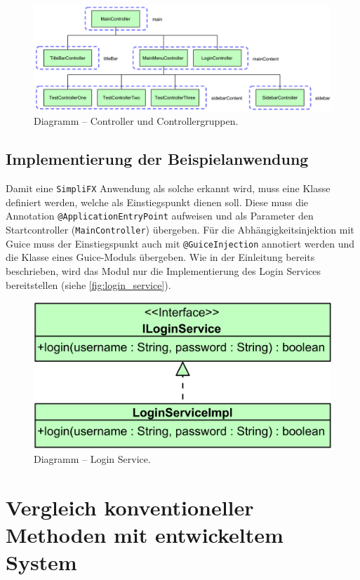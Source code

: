 \begin{figure}[H]
	\centering
	\includegraphics[width=\textwidth]{Abbildungen/Controller Relations.png}
	\caption{Diagramm -- Controller und Controllergruppen.}
	\label{fig:controller_relations}
\end{figure}
\subsection{Implementierung der Beispielanwendung}
Damit eine \texttt{SimpliFX} Anwendung als solche erkannt wird, muss eine Klasse definiert werden, welche als Einstiegspunkt dienen soll. Diese muss die Annotation \texttt{@ApplicationEntryPoint} aufweisen und als Parameter den Startcontroller (\texttt{MainController}) übergeben. Für die Abhängigkeitsinjektion mit Guice muss der Einstiegspunkt auch mit \texttt{@GuiceInjection} annotiert werden und die Klasse eines Guice-Moduls übergeben. Wie in der Einleitung bereits beschrieben, wird das Modul nur die Implementierung des Login Services bereitstellen (siehe \autoref{fig:login_service}). 
\begin{figure}[H]
	\centering
	\includegraphics[width=\textwidth-5cm]{Abbildungen/Login Service.png}
	\caption{Diagramm -- Login Service.}
	\label{fig:login_service}
\end{figure}

\section{Vergleich konventioneller Methoden mit entwickeltem System}
\label{vergleich_system_javafx}

